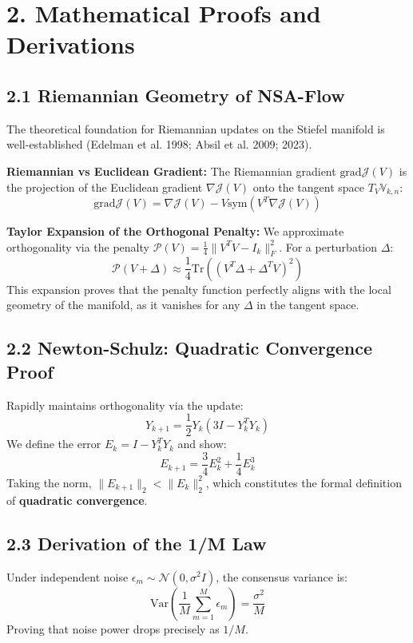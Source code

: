 \documentclass[
  letterpaper,
]{report}
\begin{document}
\section{2. Mathematical Proofs and
Derivations}\label{mathematical-proofs-and-derivations}

\subsection{2.1 Riemannian Geometry of
NSA-Flow}\label{riemannian-geometry-of-nsa-flow}

The theoretical foundation for Riemannian updates on the Stiefel
manifold is well-established (Edelman et al. 1998; Absil et al. 2009;
2023).

\textbf{Riemannian vs Euclidean Gradient:} The Riemannian gradient
\(\text{grad} \mathcal{J}(V)\) is the projection of the Euclidean
gradient \(\nabla \mathcal{J}(V)\) onto the tangent space
\(T_V \mathbb{V}_{k,n}\):
\[ \text{grad} \mathcal{J}(V) = \nabla \mathcal{J}(V) - V \text{sym}(V^T \nabla \mathcal{J}(V)) \]

\textbf{Taylor Expansion of the Orthogonal Penalty:} We approximate
orthogonality via the penalty
\(\mathcal{P}(V) = \frac{1}{4} \| V^T V - I_k \|_F^2\). For a
perturbation \(\Delta\):
\[ \mathcal{P}(V + \Delta) \approx \frac{1}{4} \text{Tr}\left( (V^T \Delta + \Delta^T V)^2 \right) \]
This expansion proves that the penalty function perfectly aligns with
the local geometry of the manifold, as it vanishes for any \(\Delta\) in
the tangent space.

\subsection{2.2 Newton-Schulz: Quadratic Convergence
Proof}\label{newton-schulz-quadratic-convergence-proof}

Rapidly maintains orthogonality via the update:
\[ Y_{k+1} = \frac{1}{2} Y_k (3I - Y_k^T Y_k) \] We define the error
\(E_k = I - Y_k^T Y_k\) and show:
\[ E_{k+1} = \frac{3}{4} E_k^2 + \frac{1}{4} E_k^3 \] Taking the norm,
\(\| E_{k+1} \|_2 < \| E_k \|_2^2\), which constitutes the formal
definition of \textbf{quadratic convergence}.

\subsection{2.3 Derivation of the 1/M
Law}\label{derivation-of-the-1m-law}

Under independent noise \(\epsilon_m \sim \mathcal{N}(0, \sigma^2 I)\),
the consensus variance is:
\[ \text{Var}\left( \frac{1}{M} \sum_{m=1}^M \epsilon_m \right) = \frac{\sigma^2}{M} \]
Proving that noise power drops precisely as \(1/M\).
\end{document}
